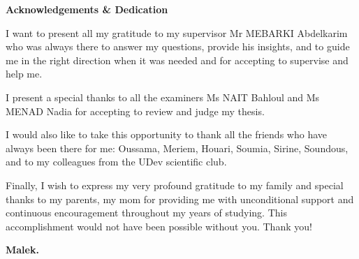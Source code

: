 \newenvironment{acknowledgement}{
  \vspace*{\fill}
  \begin{center}%
    \bfseries Acknowledgements \& Dedication
  \end{center}}%
  {\vfill}
  
  \thispagestyle{empty}
  
\begin{acknowledgement}

    I want to present all my gratitude to my supervisor Mr MEBARKI Abdelkarim who was always there to answer my questions, provide his insights, and to  guide me in the right direction when it was needed and for accepting to supervise and help me. 
    
    I present a special thanks to all the examiners Ms NAIT Bahloul and Ms MENAD Nadia for accepting to review and judge my thesis.
 
    I would also like to take this opportunity to thank all the friends who have always been there for me: Oussama, Meriem, Houari, Soumia, Sirine, Soundous, and to my colleagues from the UDev scientific club.
 
    Finally, I wish to express my very profound gratitude to my family and special thanks to my parents, my mom for providing me with unconditional support and continuous encouragement throughout my years of studying. This accomplishment would not have been possible without you. Thank you!



\begin{flushright}
\textbf{Malek.}
\end{flushright}
\end{acknowledgement}

\clearpage